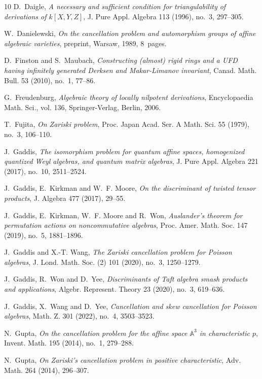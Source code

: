 \documentclass{amsart}
\theoremstyle{plain}
\numberwithin{theorem}{section}
\numberwithin{equation}{theorem}
\theoremstyle{definition}
\begin{document}
\begin{thebibliography}{10}
D.~Daigle,
\emph{A necessary and sufficient condition for triangulability of derivations of $k[X,Y,Z]$},
J. Pure Appl. Algebra 113 (1996), no.~3, 297--305.

W.~Danielewski,
\emph{On the cancellation problem and automorphism groups of affine algebraic varieties},
preprint, Warsaw, 1989, 8~pages.

D.~Finston and S.~Maubach,
\emph{Constructing (almost) rigid rings and a UFD having infinitely generated Derksen and Makar-Limanov invariant},
Canad. Math. Bull. 53 (2010), no.~1, 77--86.

G.~Freudenburg,
\emph{Algebraic theory of locally nilpotent derivations},
Encyclopaedia Math. Sci., vol. 136, Springer-Verlag, Berlin, 2006.

T.~Fujita,
\emph{On Zariski problem},
Proc. Japan Acad. Ser. A Math. Sci. 55 (1979), no.~3, 106--110.

J.~Gaddis,
\emph{The isomorphism problem for quantum affine spaces, homogenized quantized Weyl algebras, and quantum matrix algebras},
J. Pure Appl. Algebra 221 (2017), no.~10, 2511--2524.

J.~Gaddis, E.~Kirkman and W.~F. Moore,
\emph{On the discriminant of twisted tensor products},
J. Algebra 477 (2017), 29--55.

J.~Gaddis, E.~Kirkman, W.~F. Moore and R.~Won,
\emph{Auslander's theorem for permutation actions on noncommutative algebras},
Proc. Amer. Math. Soc. 147 (2019), no.~5, 1881--1896.

J.~Gaddis and X.-T. Wang,
\emph{The Zariski cancellation problem for Poisson algebras},
J. Lond. Math. Soc. (2) 101 (2020), no.~3, 1250--1279.


J.~Gaddis, R.~Won and D.~Yee,
\emph{Discriminants of Taft algebra smash products and applications},
Algebr. Represent. Theory 23 (2020), no.~3, 619--636.


J.~Gaddis, X.~Wang and D.~Yee,
\emph{Cancellation and skew cancellation for Poisson algebras},
Math. Z. 301 (2022), no.~4, 3503--3523.



N.~Gupta,
\emph{On the cancellation problem for the affine space $\mathbb{A}^3$ in characteristic $p$},
Invent. Math. 195 (2014), no.~1, 279--288.

N.~Gupta,
\emph{On Zariski's cancellation problem in positive characteristic},
Adv. Math. 264 (2014), 296--307.


\end{thebibliography}
\end{document}
